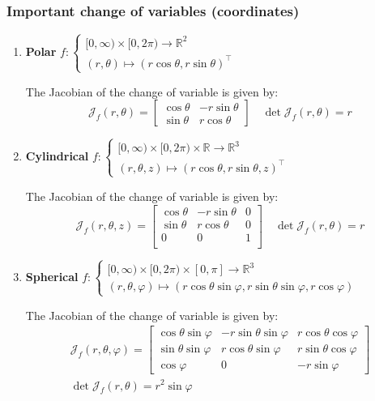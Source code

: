 \documentclass[a4paper, 10pt]{article}
\theoremstyle{definition}
\newcommand{\R}{\mathbb{R}}
\newcommand{\J}{\mathcal{J}}
\begin{document}
\subsubsection{Important change of variables (coordinates)}
\label{coords}
\begin{enumerate}[leftmargin=0pt]
    \item \textbf{Polar}  \(f :\begin{cases}
        [0, \infty) \times [0, 2\pi) \to \R^2 \\
        (r, \theta) \mapsto (r \cos \theta, r \sin \theta)^\top
    \end{cases}\)
    
    The Jacobian of the change of variable is given by:
    \[\J_f(r, \theta) = \begin{bmatrix}
        \cos \theta & -r \sin \theta \\
        \sin \theta & r \cos \theta
    \end{bmatrix} \quad \det \J_f(r, \theta) = r\]

    \item \textbf{Cylindrical}  \(f :\begin{cases}
        [0, \infty) \times [0, 2\pi) \times \R \to \R^3 \\
        (r, \theta, z) \mapsto (r \cos \theta, r \sin \theta, z)^\top
    \end{cases}\)
    
    The Jacobian of the change of variable is given by:
    \[\J_f(r, \theta, z) = \begin{bmatrix}
        \cos \theta & -r \sin \theta & 0\\
        \sin \theta & r \cos \theta & 0 \\
        0 & 0 & 1 \\
    \end{bmatrix} \quad \det \J_f(r, \theta) = r\]

    \item \textbf{Spherical} \(f :\begin{cases}
        [0, \infty) \times [0, 2\pi) \times [0, \pi] \to \R^3 \\
        (r, \theta, \varphi) \mapsto (r \cos \theta \sin \varphi, r \sin \theta \sin \varphi, r \cos \varphi)
    \end{cases}\)
    
    The Jacobian of the change of variable is given by:
    \begin{gather*}
        \J_f(r, \theta, \varphi) = \begin{bmatrix}
            \cos \theta \sin \varphi & -r \sin \theta \sin \varphi & r \cos \theta \cos \varphi \\
            \sin \theta \sin \varphi & r \cos \theta \sin \varphi & r \sin \theta \cos \varphi \\
            \cos \varphi & 0 & -r \sin \varphi
        \end{bmatrix} \\
        \det \J_f(r, \theta) = r^2 \sin \varphi
    \end{gather*}
\end{enumerate}
\end{document}
